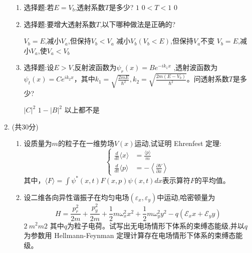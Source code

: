 \begin{enumerate}
\begin{enumerate}
	\item 
	选择题:若$ E=V_{b} $,透射系数$ T $是多少?
\threechoices
{$1$}
{$0<T<1$}
{$0 $}

\item 
选择题:要增大透射系数$ T $,以下哪种做法是正确的?


\threechoices
{$ V_{b} =E $,减小$ V_{a} $,但保持$ V_{b}<V_{a} $}
{减小$ V_{b}( V_{b} <E) $,但保持$ V_{a} $不变}
{$ V_{b} =E $,减小$ V_{a} $,使$ V_{a}< V_{b} $}


\item 
选择题:设$ E>V $,反射波函数为$\psi_{r}(x)=B e^{-i k_{1} x}$ ,透射波函数为$\psi_{t}(x)=C e^{i k_{2} x}$，其中$k_{1}=\sqrt{\frac{2 m E}{\hbar^{2}}},  k_{2}=\sqrt{\frac{2 m\left(E-V_{b}\right)}{\hbar^{2}}}$。问透射系数$ T $是多少?

\threechoices
{$ |C|^{2} $}
{$1-|B|^{2}$}
{以上都不是}





	
	
	
	
	
	
	
\end{enumerate}


\item 
(共30分)
\begin{enumerate}
	\item
设质量为$ m $的粒子在一维势场$ V(x) $运动,试证明  Ehrenfest 定理:
$$\left\{\begin{aligned}
	\frac{d}{d t}\langle x\rangle&=\frac{\langle p\rangle}{m} \\ \frac{d}{d t}\langle p\rangle&=-\left\langle\frac{\partial V}{\partial x}\right\rangle
\end{aligned}\right.$$
其中，$\langle F\rangle=\int \psi^{*}(x, t) F(x, p) \psi(x, t) d x$表示算符$ F $的平均值。

\item 
设二维各向异性谐振子在均匀电场$\left(\varepsilon_{x}, \varepsilon_{y}\right)$中运动,哈密顿量为
$$
H=\frac{p_{r}^{2}}{2 m}+\frac{p_{y}^{2}}{2 m}+\frac{1}{2} m \omega_{x}^{2} x^{2}+\frac{1}{2} m \omega_{y}^{2} y^{2}-q\left(\mathcal{E}_{x} x+\mathcal{E}_{y} y\right)
$$
$ 2 \ m^{2}m2 $
其中$ q $为粒子电荷。试写出无电场情形下体系的束缚态能级,并以$ q $为参数用
Hellmann-Feynman 定理计算存在电场情形下体系的束缚态能级。





\end{enumerate}
\end{enumerate}
